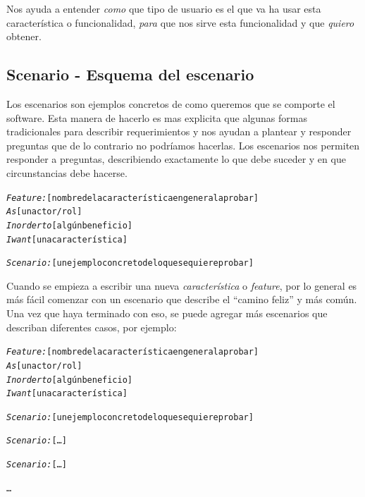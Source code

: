 Nos ayuda a entender {\it como} que tipo de usuario es el que va ha usar esta
característica o funcionalidad, {\it para} que nos sirve esta funcionalidad y que
{\it quiero} obtener.

\subsection{Scenario - Esquema del escenario}
Los escenarios son ejemplos concretos de como queremos que se comporte el software.
Esta manera de hacerlo es mas explicita que algunas formas tradicionales para
describir requerimientos y nos ayudan a plantear y responder preguntas que de lo
contrario no podríamos hacerlas. Los escenarios nos permiten responder a preguntas,
describiendo exactamente lo que debe suceder y en que circunstancias debe hacerse.
\newpage
\vspace{0.5cm}
\begin{mdframed}
\begin{alltt}
\emph{Feature:} [nombre de la característica en general a probar]
  \emph{As} [un actor/rol]
  \emph{In order to} [algún beneficio]
  \emph{I want} [una característica]

  \emph{Scenario:} [un ejemplo concreto de lo que se quiere probar]
\end{alltt}
\end{mdframed}
\vspace{0.5cm}

Cuando se empieza a escribir una nueva {\it característica} o {\it feature}, por
lo general es más fácil comenzar con un escenario que describe el ``camino feliz''
y más común. Una vez que haya terminado con eso, se puede agregar más escenarios
que describan diferentes casos, por ejemplo:

\vspace{0.5cm}
\begin{mdframed}
\begin{alltt}
\emph{Feature:} [nombre de la característica en general a probar]
  \emph{As} [un actor/rol]
  \emph{In order to} [algún beneficio]
  \emph{I want} [una característica]

  \emph{Scenario:} [un ejemplo concreto de lo que se quiere probar]

  \emph{Scenario:} [\ldots]

  \emph{Scenario:} [\ldots]

  \ldots
\end{alltt}
\end{mdframed}
\vspace{0.5cm}

